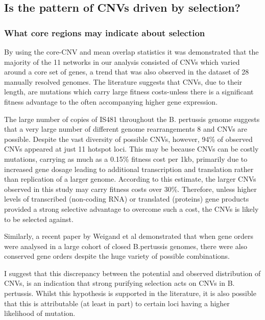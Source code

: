 \documentclass{article}
\begin{document}
\subsection{Is the pattern of CNVs driven by selection?}

\subsubsection{What core regions may indicate about selection}
By using the core-CNV and mean overlap statistics it was demonstrated that the majority of the 11 networks in our analysis consisted of CNVs which varied around a core set of genes, a trend that was also observed in the dataset of 28 manually resolved genomes. The literature suggests that CNVs, due to their length, are mutations which carry large fitness costs-unless there is a significant fitness advantage to the often accompanying higher gene expression.

The large number of copies of IS481 throughout the B. pertussis genome suggests that a very large number of different genome rearrangements 8 and CNVs are possible. Despite the vast diversity of possible CNVs, however, 94\% of observed CNVs appeared at just 11 hotspot loci. This may be because CNVs can be costly mutations, carrying as much as a 0.15\% fitness cost per 1kb, primarily due to increased gene dosage leading to additional transcription and translation rather than replication of a larger genome. According to this estimate, the larger CNVs observed in this study may carry fitness costs over 30\%. Therefore, unless higher levels of transcribed (non-coding RNA) or translated (proteins) gene products provided a strong selective advantage to overcome such a cost, the CNVs is likely to be selected against.

Similarly, a recent paper by Weigand et al demonstrated that when gene orders were analysed in a large cohort of closed B.pertussis genomes, there were also conserved gene orders despite the huge variety of possible combinations. 


 I suggest that this discrepancy between the potential and observed distribution of CNVs, is an indication that strong purifying selection acts on CNVs in B. pertussis. Whilst this hypothesis is supported in the literature, it is also possible that this is attributable (at least in part) to certain loci having a higher likelihood of mutation. 
\end{document}
